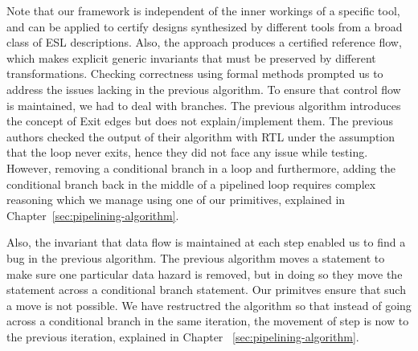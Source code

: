 Note that our framework is independent of the inner workings of a specific tool, and can be applied to certify designs synthesized by different tools from a broad class of ESL descriptions. Also, the approach produces a certified reference flow, which makes explicit generic invariants that must be preserved by different transformations. Checking correctness using formal methods prompted us to address the issues lacking in the previous algorithm. To ensure that control flow is maintained, we had to deal with branches. The previous algorithm introduces the concept of Exit edges but does not explain/implement them. The previous authors checked the output of their algorithm with RTL under the assumption that the loop never exits, hence they did not face any issue while testing. However, removing a conditional branch in a loop and furthermore, adding the conditional branch back in the middle of a pipelined loop requires complex reasoning which we manage using one of our primitives, explained in Chapter~\ref{sec:pipelining-algorithm}.

Also, the invariant that data flow is maintained at each step enabled us to find a bug in the previous algorithm. The previous algorithm moves a statement to make sure one particular data hazard is removed, but in doing so they move the statement across a conditional branch statement. Our primitves ensure that such a move is not possible. We have restructred the algorithm so that instead of going across a conditional branch in the same iteration, the movement of step is now to the previous iteration, explained in Chapter ~\ref{sec:pipelining-algorithm}. 


